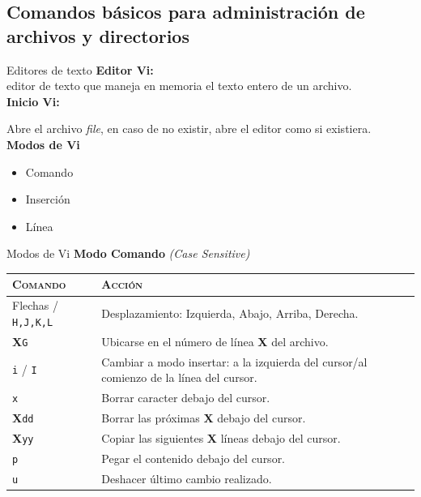 \documentclass{beamer}
\begin{document}
\subsection{Comandos básicos para administración de archivos y directorios}
\begin{frame}{Editores de texto}
\textbf{Editor Vi:} \\editor de texto que maneja en memoria el texto entero de un archivo.\\[0.5cm]
\textbf{Inicio Vi:} 
\begin{center}
\end{center}
Abre el archivo \textit{file}, en caso de no existir, abre el editor como si existiera.\\[0.5cm]
\textbf{Modos de Vi}
\begin{itemize}
    \item Comando
    \item Inserción
    \item Línea
\end{itemize}
\end{frame}
\begin{frame}{Modos de Vi}
\textbf{Modo Comando} \textit{\small (Case Sensitive)}\\[0.5cm]
{\scriptsize
\begin{tabular}{l|p{8cm}}
     \textsc{Comando}&\textsc{Acción}\\\hline
     Flechas / \texttt{H,J,K,L} & Desplazamiento: Izquierda, Abajo, Arriba, Derecha.\\\hline
     \textbf{X}\texttt{G} & Ubicarse en el número de línea \textbf{X} del archivo.\\\hline
     \texttt{i} / \texttt{I} & Cambiar a modo insertar: a la izquierda del cursor/al comienzo de la línea del cursor.\\\hline
     \texttt{x} &Borrar caracter debajo del cursor.\\\hline
     \textbf{X}\texttt{dd} &Borrar las próximas \textbf{X}  debajo del cursor.\\\hline
     \textbf{X}\texttt{yy} &Copiar las siguientes \textbf{X} líneas debajo del cursor. \\\hline
     \texttt{p} &Pegar el contenido debajo del cursor. \\\hline
     \texttt{u} &Deshacer último cambio realizado.
\end{tabular}

}
\end{frame}
\end{document}
